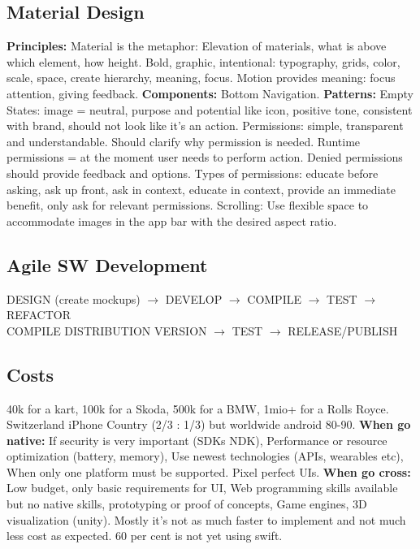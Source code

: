\subsection{Material Design}
\textbf{Principles:} Material is the metaphor: Elevation of materials, what is above which element, how height. Bold, graphic, intentional: typography, grids, color, scale, space, create hierarchy, meaning, focus. Motion provides meaning: focus attention, giving feedback.
\textbf{Components:} Bottom Navigation. 
\textbf{Patterns:} Empty States: image = neutral, purpose and potential like icon, positive tone, consistent with brand, should not look like it's an action. Permissions: simple, transparent and understandable. Should clarify why permission is needed. Runtime permissions = at the moment user needs to perform action. Denied permissions should provide feedback and options. Types of permissions: educate before asking, ask up front, ask in context, educate in context, provide an immediate benefit, only ask for relevant permissions. Scrolling: Use flexible space to accommodate images in the app bar with the desired aspect ratio. 

\subsection{Agile SW Development}
DESIGN (create mockups) $\rightarrow$ DEVELOP $\rightarrow$ COMPILE $\rightarrow$ TEST $\rightarrow$ REFACTOR \\
COMPILE DISTRIBUTION VERSION $\rightarrow$ TEST $\rightarrow$ RELEASE/PUBLISH \\

\subsection{Costs}
40k for a kart, 100k for a Skoda, 500k for a BMW, 1mio+ for a Rolls Royce. Switzerland iPhone Country (2/3 : 1/3) but worldwide android 80-90. \textbf{When go native:} If security is very important (SDKs NDK), Performance or resource optimization (battery, memory), Use newest technologies (APIs, wearables etc), When only one platform must be supported. Pixel perfect UIs. \textbf{When go cross:} Low budget, only basic requirements for UI, Web programming skills available but no native skills, prototyping or proof of concepts, Game engines, 3D visualization (unity). Mostly it's not as much faster to implement and not much less cost as expected. 60 per cent is not yet using swift.

